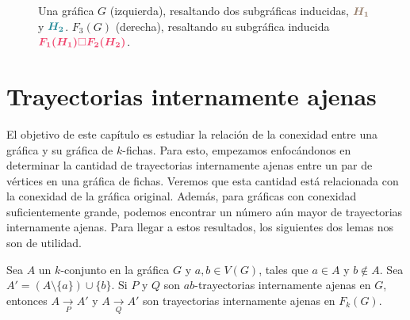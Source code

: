 \begin{figure}[ht!]
    \caption{Una gr\'afica $G$ (izquierda), resaltando dos subgr\'aficas
    inducidas, ${\color{baige}\boldsymbol {H_1}}$ y
    ${\color{azulMetal}\boldsymbol {H_2}}$. $F_3(G)$ (derecha), resaltando su
    subgr\'afica inducida ${\color{fushia}\boldsymbol {F_1(H_1) \square
    F_2(H_2)}}$.}
    \label{fig:ex-cart}
    \end{figure}

\newpage

\section{Trayectorias internamente ajenas}%
\label{sec:TrayIntAj}

El objetivo de este cap\'itulo es estudiar la relaci\'on de la conexidad entre
una gr\'afica y su gr\'afica de $k$-fichas. Para esto, empezamos enfoc\'andonos
en determinar la cantidad de trayectorias internamente ajenas entre un par de
v\'ertices en una gr\'afica de fichas. Veremos que esta cantidad est\'a
relacionada con la conexidad de la gr\'afica original. Adem\'as, para gr\'aficas
con conexidad suficientemente grande, podemos encontrar un n\'umero a\'un mayor
de trayectorias internamente ajenas. Para llegar a estos resultados, los
siguientes dos lemas nos son de utilidad.

\begin{lema}%
\label{lem:TrayIntAj-G-FG}
    Sea $A$ un $k$-conjunto en la gr\'afica $G$ y $a, b \in V(G)$, tales que $a
    \in A$ y $b \notin A$. Sea $A' = (A \setminus \{ a \}) \cup \{ b \}$. Si $P$
    y $Q$ son $ab$-trayectorias internamente ajenas en $G$, entonces $A
    \xrightarrow[P]{} A'$ y $A \xrightarrow[Q]{} A'$ son trayectorias
    internamente ajenas en $F_{k}(G)$.
\end{lema}

